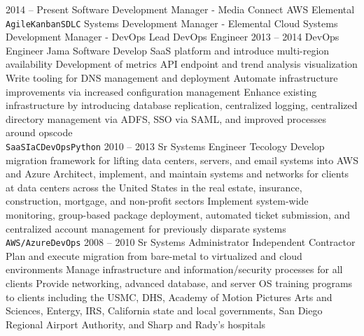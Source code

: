 \documentclass[10pt]{jvresume2020} %
\begin{document}
\begin{entrylist}
	\entry
		{2014 -- Present}
		{Software Development Manager - Media Connect}
		{AWS Elemental}
		{\lorem \lorem \lorem\\ \texttt{Agile}\slashsep\texttt{Kanban}\slashsep\texttt{SDLC}}
	\entry
	  {}
		{Systems Development Manager - Elemental Cloud}
		{}
		{\lorem \lorem \lorem}
	\entry
	  {}
		{Systems Development Manager - DevOps}
		{}
		{\lorem \lorem \lorem}
	\entry
	  {}
		{Lead DevOps Engineer}
			{}
			{\lorem \lorem \lorem}
	\entry
		{2013 -- 2014}
		{DevOps Engineer}
		{Jama Software}
		{{Develop SaaS platform and introduce multi-region availability\linebreak
		Development of metrics API endpoint and trend analysis visualization\linebreak
		Write tooling for DNS management and deployment\linebreak
		Automate infrastructure improvements via increased configuration management\linebreak
		Enhance existing infrastructure by introducing database replication, centralized logging, centralized directory management via ADFS, SSO via SAML, and improved processes around opscode\\
} \texttt{SaaS}\slashsep\texttt{IaC}\slashsep\texttt{DevOps}\slashsep\texttt{Python}}
	\entry
		{2010 -- 2013}
		{Sr Systems Engineer}
		{Tecology}
		{{Develop migration framework for lifting data centers, servers, and email systems into AWS and Azure\linebreak
		Architect, implement, and maintain systems and networks for clients at data centers across the United States in the real estate, insurance, construction, mortgage, and non-profit sectors\linebreak
		Implement system-wide monitoring, group-based package deployment, automated ticket submission, and centralized account management for previously disparate systems\\
} \texttt{AWS/Azure}\slashsep\texttt{DevOps}}
	\entry
		{2008 -- 2010}
		{Sr Systems Administrator}
		{Independent Contractor}
		{{Plan and execute migration from bare-metal to virtualized and cloud environments\linebreak
		Manage infrastructure and information/security processes for all clients\linebreak
		Provide networking, advanced database, and server OS training programs to clients including the USMC, DHS, Academy of Motion Pictures Arts and Sciences, Entergy, IRS, California state and local governments, San Diego Regional Airport Authority, and Sharp and Rady’s hospitals\\
}}
\end{entrylist}
\end{document}
